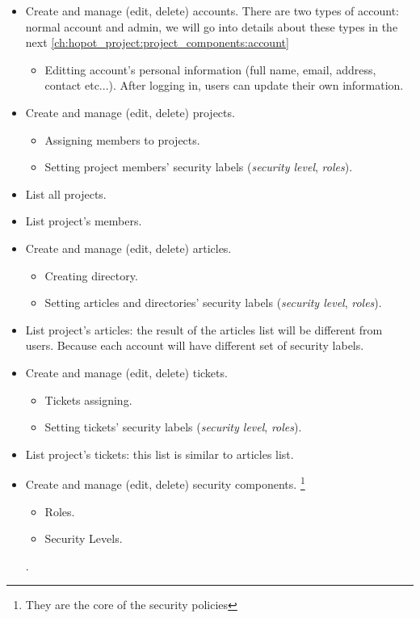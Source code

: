 \begin{itemize}
\item Create and manage (edit, delete) accounts. There are two types of account: normal account and admin, we will go into details about these types in the next \autoref{ch:hopot_project:project_components:account}
\begin{itemize} 
\item Editting account's personal information (\eg full name, email, address, contact etc...). 
After logging in, users can update their own information.
\end{itemize}

\item Create and manage (edit, delete) projects.
\begin{itemize} 
\item Assigning members to projects. 
\item Setting project members' security labels (\eg \emph{security level}, \emph{roles}).
\end{itemize}
\item List all projects.
\item List project's members.

\item Create and manage (edit, delete) articles.
\begin{itemize} 
\item Creating directory.
\item Setting articles and directories' security labels (\eg \emph{security level}, \emph{roles}).
\end{itemize}
\item List project's articles: the result of the articles list will be different from users. Because each account will have different set of security labels.

\item Create and manage (edit, delete) tickets.
\begin{itemize} 
\item Tickets assigning.
\item Setting tickets' security labels (\eg \emph{security level}, \emph{roles}).
\end{itemize}
\item List project's tickets: this list is similar to articles list.

\item Create and manage (edit, delete) security components. \footnote{They are the core of the security policies}
\begin{itemize} 
\item Roles.
\item Security Levels.
\end{itemize}.

\end{itemize}


